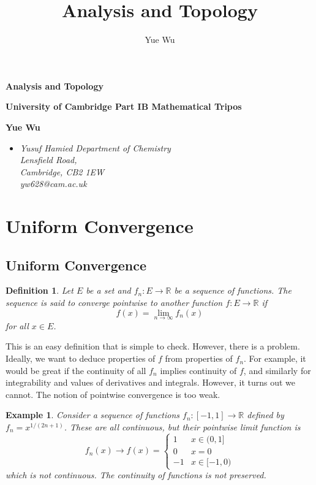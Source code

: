 \documentclass{article}
\title{Analysis and Topology}
\author{Yue Wu}
\theoremstyle{plain}\theoremheaderfont{\normalfont\itshape}\theorembodyfont{\rmfamily}\theoremseparator{.}\newtheorem*{rem}{Remark}\newtheorem*{ex}{Example}\newtheorem*{proof}{Proof}\newtheorem*{altp}{Alternative proof}
\theoremstyle{plain}\theoremheaderfont{\normalfont\bfseries}\theorembodyfont{\rmfamily}\theoremseparator{.}\newtheorem{thm}{Theorem}[section]\newtheorem{lem}[thm]{Lemma}\newtheorem{prop}[thm]{Proposition}\newtheorem*{cor}{Corollary}\newtheorem{defn}[thm]{Definition}\newtheorem{clm}[thm]{Claim}\newtheorem{clminproof}{Claim}
\theoremstyle{break}\theoremheaderfont{\normalfont\itshape}\theorembodyfont{\rmfamily}\theoremseparator{.\medskip}\newtheorem*{proofskip}{Proof}\newtheorem*{exs}{Examples}\newtheorem*{rems}{Remarks}
\theoremstyle{break}\theoremheaderfont{\normalfont\bfseries}\theorembodyfont{\rmfamily}\theoremseparator{.\medskip}\newtheorem{lemskip}[thm]{Lemma}\newtheorem{defnskip}[thm]{Definition}\newtheorem{propskip}[thm]{Proposition}\newtheorem{thmskip}[thm]{Theorem}
\begin{document}
    \setlength{\parindent}{0pt}
	\Huge\textsf{\textbf{Analysis and Topology}}
		
	\Large\textsf{\textbf{University of Cambridge Part IB Mathematical Tripos}}

	\noindent\makebox[\linewidth]{\rule{\textwidth}{2pt}}

	\large\textsf{\textbf{Yue Wu}}
	\begin{itemize}[topsep=0pt,leftmargin=15pt]
		\item[] \textit{Yusuf Hamied Department of Chemistry\\
		Lensfield Road,\\
		Cambridge, CB2 1EW}\\

		\textit{yw628@cam.ac.uk}
	\end{itemize}
    \thispagestyle{empty}
	
    \normalsize
	\newpage
	\tableofcontents
	\newpage
    \setlength{\parindent}{15pt}
    
    \section{Uniform Convergence}
    \subsection{Uniform Convergence}
    \begin{defn}
        Let \(E\) be a set and \(f_n: E\to\mathbb{R}\) be a sequence of functions. The sequence is said to \textit{converge pointwise} to another function \(f:E\to\mathbb{R}\) if
        \[f(x)=\lim_{n\to\infty}f_n(x)\]
        for all \(x\in E\).
    \end{defn}

    This is an easy definition that is simple to check. However, there is a problem. Ideally, we want to deduce properties of \(f\) from properties of \(f_n\). For example, it would be great if the continuity of all \(f_n\) implies continuity of \(f\), and similarly for integrability and values of derivatives and integrals. However, it turns out we cannot. The notion of pointwise convergence is too weak.

	\begin{ex}
		Consider a sequence of functions \(f_n:[-1,1]\to\mathbb{R}\) defined by \(f_n=x^{1/(2n+1)}\). These are all continuous, but their pointwise limit function is
		\[f_n(x)\to f(x)=\begin{cases}
			1 & x\in(0,1]\\
			0 & x=0\\
			-1 & x\in[-1,0)
		\end{cases}\]
		which is not continuous. The continuity of functions is not preserved.
	\end{ex}
\end{document}

